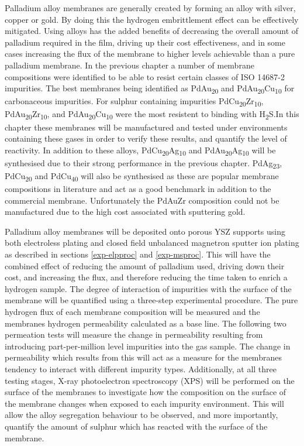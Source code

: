 Palladium alloy membranes are generally created by forming an alloy with silver, copper or gold. By doing this the hydrogen embrittlement effect can be effectively mitigated. Using alloys has the added benefits of decreasing the overall amount of palladium required in the film, driving up their cost effectiveness, and in some cases increasing the flux of the membrane to higher levels achievable than a pure palladium membrane. In the previous chapter a number of membrane compositions were identified to be able to resist certain classes of ISO 14687-2 impurities. The best membranes being identified as PdAu\textsubscript{20} and PdAu\textsubscript{20}Cu\textsubscript{10} for carbonaceous impurities. For sulphur containing impurities PdCu\textsubscript{20}Zr\textsubscript{10}, PdAu\textsubscript{20}Zr\textsubscript{10}, and PdAu\textsubscript{20}Cu\textsubscript{10} were the most resistent to binding with H\textsubscript{2}S.In this chapter these membranes will be manufactured and tested under environments containing these gases in order to verify these results, and quantify the level of reactivity. In addition to these alloys, PdCu\textsubscript{20}Ag\textsubscript{10} and PdAu\textsubscript{20}Ag\textsubscript{10} will be synthesised due to their strong performance in the previous chapter. PdAg\textsubscript{23}, PdCu\textsubscript{20} and PdCu\textsubscript{40} will also be synthesised as these are popular membrane compositions in literature and act as a good benchmark in addition to the commercial membrane. Unfortunately the PdAuZr composition could not be manufactured due to the high cost associated with sputtering gold.

Palladium alloy membranes will be deposited onto porous YSZ supports using both electroless plating  and closed field unbalanced magnetron sputter ion plating as described in sections \ref{exp-elpproc} and \ref{exp-msproc}. This will have the combined effect of reducing the amount of palladium used, driving down their cost, and  increasing the flux, and therefore reducing the time taken to enrich a hydrogen sample. The degree of interaction of impurities with the surface of the membrane will be quantified using a three-step experimental procedure. The pure hydrogen flux of each membrane composition will be measured and the membranes hydrogen permeability calculated as a base line. The following two permeation tests will measure the change in permeability resulting from introducing part-per-million level impurities into the gas sample. The change in permeability which results from this will act as a measure for the membranes tendency to interact with different impurity types. Additionally, at all three testing stages, X-ray photoelectron spectroscopy (XPS) will be performed on the surface of the membranes to investigate how the composition on the surface of the membrane changes when exposed to each impurity environment. This will allow the alloy segregation behaviour to be observed, and more importantly, quantify the amount of sulphur which has reacted with the surface of the membrane. 

